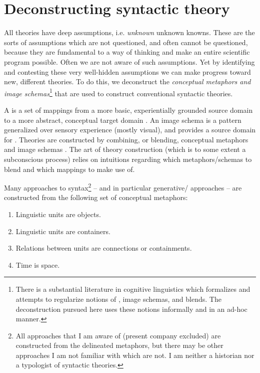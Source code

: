 \chapter{Deconstructing syntactic theory}

All theories have deep assumptions, i.e. \textit{unknown} unknown knowns. These are the sorts of assumptions which are not questioned, and often cannot be questioned, because they are fundamental to a way of thinking and make an entire scientific program possible. Often we are not aware of such assumptions. Yet by identifying and contesting these very well-hidden assumptions we can make progress toward new, different theories. To do this, we deconstruct the \textit{conceptual metaphors and image schemas}\footnote{There is a substantial literature in cognitive linguistics which formalizes and attempts to regularize notions of , image schemas, and blends. The deconstruction pursued here uses these notions informally and in an ad-hoc manner.} that are used to construct conventional syntactic theories. 

  A  is a set of mappings from a more basic, experientially grounded source domain to a more abstract, conceptual target domain \citep{Lakoff1990,Lakoff1993,Lakoff2008,LakoffJohnson1980a,LakoffJohnson1980b,LakoffJohnson1999,LakoffJohnson2000}. An image schema is a pattern generalized over sensory experience (mostly visual), and provides a source domain for  \citep{ClausnerCroft1999,FauconnierTurner1996,FauconnierTurner2008,GibbsColston1995,GradyEtAl1999,Langacker2002,Oakley2007,Talmy1983,Talmy1988}. Theories are constructed by combining, or blending, conceptual metaphors and image schemas \citep{FauconnierTurner1996,FauconnierTurner2008,GradyEtAl1999,LakoffNúñez2000}. The art of theory construction (which is to some extent a subconscious process) relies on intuitions regarding which metaphors/schemas to blend and which mappings to make use of.

  Many approaches to syntax\footnote{All approaches that I am aware of (present company excluded) are constructed from the delineated metaphors, but there may be other approaches I am not familiar with which are not. I am neither a historian nor a typologist of syntactic theories.} -- and in particular generative/ approaches -- are constructed from the following set of conceptual metaphors: 

\begin{enumerate}
\item Linguistic units are objects.
\item Linguistic units are containers.
\item Relations between units are connections or containments.
\item Time is space.
\end{enumerate}

